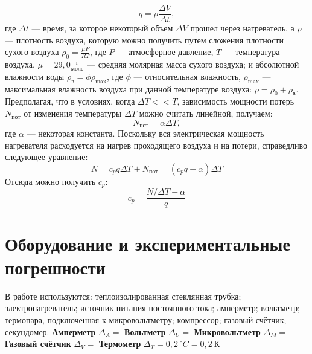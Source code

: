 \documentclass[a4paper,11pt]{article}
\begin{document}
\begin{equation}    \label{eq4}
q = \rho \frac{\Delta V}{\Delta t},
\end{equation}
где $\Delta t$ — время, за которое некоторый объем $\Delta V$ прошел через нагреватель, а $\rho$ — плотность воздуха, которую можно получить путем сложения плотности сухого воздуха $\rho _{0} = \frac{\mu P}{RT}$, где $P$ — атмосферное давление, $T$ — температура воздуха, $\mu = 29,0 \frac{г}{моль}$ — средняя молярная масса сухого воздуха; и абсолютной влажности воды $\rho _{в} = \phi \rho _{\max}$, где $\phi$ — относительная влажность, $\rho _{\max}$ — максимальная влажность воздуха при данной температуре воздуха: $\rho = \rho _{0} + \rho _{в}$.\newline
Предполагая, что в условиях, когда $\Delta T << T$, зависимость мощности потерь $N_{пот}$ от изменения температуры $\Delta T$ можно считать линейной, получаем:\newline
\begin{equation}    \label{eq5}
N_{пот} = \alpha \Delta T,
\end{equation}
где $\alpha$ — некоторая константа.\newline
Поскольку вся электрическая мощность нагревателя расходуется на нагрев проходящего воздуха и на потери, справедливо следующее уравнение:\newline
\begin{equation}    \label{eq6}
N = c_{p}q \Delta T + N_{пот} = (c_{p}q +\alpha) \Delta T
\end{equation}
Отсюда можно получить $c_{p}$:
\begin{equation}    \label{eq7}
c_{p} = \frac{N / \Delta T - \alpha}{q}
\end{equation}
\section{Оборудование и экспериментальные погрешности}
В работе используются: теплоизолированная стеклянная трубка; электронагреватель; источник питания постоянного тока; амперметр; вольтметр; термопара, подключенная к микровольтметру; компрессор; газовый счётчик; секундомер.\newline
\textbf{Амперметр} $\Delta _{A} = $\newline
\textbf{Вольтметр} $\Delta _{U} = $\newline
\textbf{Микровольтметр} $\Delta _{M} = $\newline
\textbf{Газовый счётчик} $\Delta _{V} = $\newline
\textbf{Термометр} $\Delta _{T} = 0,2\ ^{\circ}C = 0,2\ К$
\end{document}
